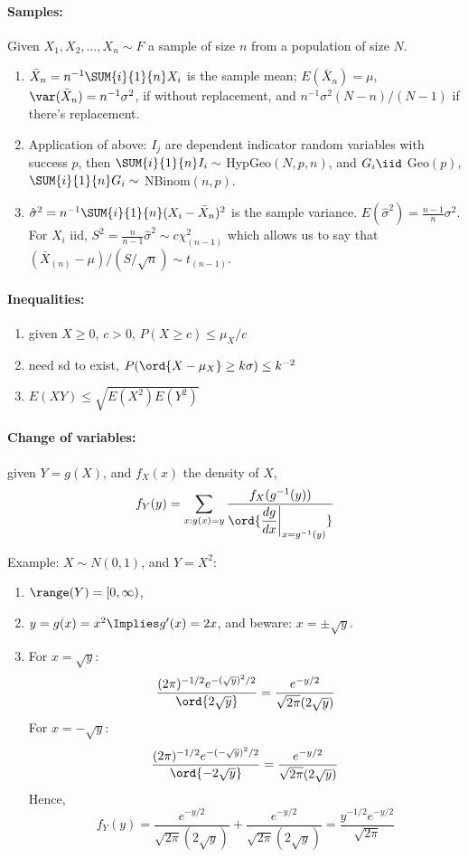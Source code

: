 \documentclass[10pt]{article}
\begin{document}
 \begin{multicols}{2}

\paragraph{Samples:} Given $X_1, X_2, \ldots, X_n \sim F$ a sample of size $n$ from a population of size $N$.
\begin{enumerate}
\item $\bar{X}_{n} = n^{-1} \SUM{i}{1}{n} X_i$ is the sample mean; $E(\bar{X}_{n}) = \mu$, $\var(\bar{X}_{n}) = n^{-1}\sigma^2$, if without replacement, and $n^{-1}\sigma^2(N-n)/(N-1)$ if there's replacement. 
\item Application of above: $I_j$ are dependent indicator random variables with success $p$, then $\SUM{i}{1}{n} I_i \sim$ HypGeo$(N,p,n)$, and $G_i \iid$ Geo$(p)$, $\SUM{i}{1}{n} G_i \sim$ NBinom$(n,p)$. 
\item $\hat{\sigma}^2 = n^{-1}\SUM{i}{1}{n} (X_i - \bar{X}_{n})^2$ is the sample variance. $E(\hat{\sigma}^2) = \frac{n-1}{n}\sigma^{2}$. For $X_i$ iid, $S^2 = \frac{n}{n-1}\hat{\sigma}^{2} \sim c \chi_{(n-1)}^{2}$ which allows us to say that $(\bar{X}_{(n)} - \mu)/(S/\sqrt{n}) \sim t_{(n-1)}$. 
\end{enumerate}



\paragraph{Inequalities:}
\begin{enumerate}
\item given $X \geq 0$, $c > 0$, $P( X \geq c) \leq \mu_{X}/c$
\item need sd to exist, $P(\ord{X-\mu_{X}} \geq k\sigma) \leq k^{-2}$
\item $E(XY) \leq \sqrt{E(X^2) E(Y^2)}$
\end{enumerate}


\paragraph{Change of variables:} given $Y = g(X)$, and $f_{X}(x)$ the density of $X$, 
\[
f_{Y}(y) = \sum_{x : g(x) = y} \frac{f_{X}(g^{-1}(y))}{\ord{\dfrac{dg}{dx}\biggr|_{x=g^{-1}(y)}}}
\]

Example: $X \sim N(0,1)$, and $Y = X^2$:
\begin{enumerate}
\item $\range(Y) = [0,\infty)$,
\item $y=g(x) = x^2 \Implies g'(x) = 2x$, and beware: $x = \pm \sqrt{y}$.
\item For $x  = \sqrt{y}$:
\[
\frac{(2\pi)^{-1/2} e^{-(\sqrt{y})^2/2}}{\ord{2 \sqrt{y}}} = \frac{e^{-y/2}}{\sqrt{2\pi}(2\sqrt{y})}
\]
For $x = -\sqrt{y}$:
\[
 \frac{(2\pi)^{-1/2} e^{-(-\sqrt{y})^2/2}}{\ord{-2 \sqrt{y}}} = \frac{e^{-y/2}}{\sqrt{2\pi}(2\sqrt{y})}
\]
Hence,
\[
f_{Y}(y) = \frac{e^{-y/2}}{\sqrt{2\pi}(2\sqrt{y})} + \frac{e^{-y/2}}{\sqrt{2\pi}(2\sqrt{y})} = \frac{y^{-1/2}e^{-y/2}}{\sqrt{2\pi}} 
\]
\end{enumerate}


\end{multicols}
\end{document}
